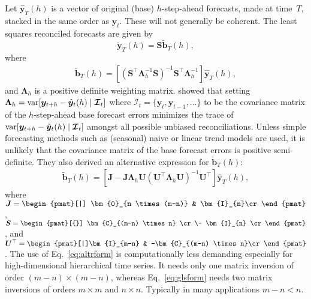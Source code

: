 \documentclass[twocolumn]{svjour3}
\newcommand{\var}{\textnormal{var}}
\newcommand{\bS}{\bm{S}}
\newcommand{\bC}{\bm{C}}
\newcommand{\bI}{\bm{I}}
\begin{document}
Let $\hat{\bm{y}}_T(h)$ is a vector of original (base) $h$-step-ahead forecasts, made at time~$T$, stacked in the same order as $\bm{y}_t$. These will not generally be coherent. The least squares reconciled forecasts are given by
$$
\tilde{\bm{y}}_{T}(h) = \bm{S}\tilde{\bm{b}}_{T}(h),
$$
where
\begin{align}
\tilde{\bm{b}}_{T}(h) = \left[(\bm{S}^\top\bm{\Lambda}_{h}^{-1}\bm{S})^{-1}\bm{S}^\top\bm{\Lambda}_{h}^{-1}\right]\hat{\bm{y}}_{T}(h),
\label{eq:glsform}
\end{align}
and $\bm{\Lambda}_h$ is a {\color{red} positive definite} weighting matrix. \citet{Wick2018} showed that setting $\bm{\Lambda}_h =\var[\bm{y}_{t+h} - \hat{\bm{y}}_{t}(h)\mid\bm{\mathcal{I}}_{t}]$ where $\bm{\mathcal{I}}_t = \{\bm{y}_{t}, \bm{y}_{t-1}, \dots \}$ to be the covariance matrix of the $h$-step-ahead base forecast errors minimizes the trace of
$\var[\bm{y}_{t+h} - \tilde{\bm{y}}_{t}(h)\mid \bm{\mathcal{I}}_{t}]$ amongst all possible unbiased reconciliations. {\color{red} Unless simple forecasting methods such as (seasonal) naive or linear trend models are used, it is unlikely that the covariance matrix of the base forecast errors is positive semi-definite.} They also derived an alternative expression for $\tilde{\bm{b}}_{T}(h)$:
\begin{align}
\tilde{\bm{b}}_{T}(h) = \left[\bm{J} - \bm{J}\bm{\Lambda}_h\bm{U}(\bm{U}^\top\bm{\Lambda}_h\bm{U})^{-1}\bm{U}^\top\right]\hat{\bm{y}}_{T}(h),
\label{eq:altrform}
\end{align}
where $\bm{J} = \begin{pmat}[|] \bm{0}_{n \times (m-n)} & \bI_{n}\cr\end{pmat}$, $\bS = \begin{pmat}[{}]
\bC_{(m-n) \times n} \cr\-
\bI_{n} \cr
\end{pmat}$, and $\bm{U}^\top = \begin{pmat}[|]\bI_{m-n}  & -\bC_{(m-n) \times n}\cr\end{pmat}$. The use of Eq.~\eqref{eq:altrform} is computationally less demanding especially for high-dimensional hierarchical time series. It needs only one matrix inversion of order $(m - n) \times (m - n)$, whereas Eq.~\eqref{eq:glsform} needs two matrix inversions of orders $m \times m$ and $n \times n$. Typically in many applications $m-n < n$.
\end{document}
